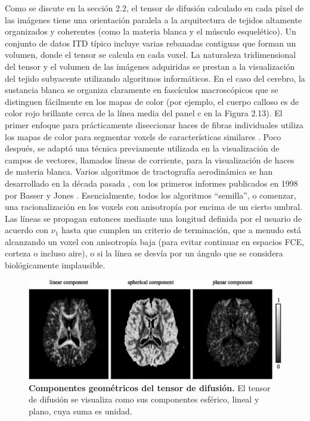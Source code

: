 \documentclass[12pt,a5,twoside]{book}
\begin{document}
Como se discute en la sección 2.2, el tensor de difusión calculado en cada píxel de las imágenes tiene una orientación paralela a la arquitectura de tejidos altamente organizados y coherentes (como la materia blanca y el músculo esquelético). Un conjunto de datos ITD típico incluye varias rebanadas contiguas que forman un volumen, donde el tensor se calcula en cada voxel. La naturaleza tridimensional del tensor y el volumen de las imágenes adquiridas se prestan a la visualización del tejido subyacente utilizando algoritmos informáticos. 
En el caso del cerebro, la sustancia blanca se organiza claramente en fascículos macroscópicos que se distinguen fácilmente en los mapas de color (por ejemplo, el cuerpo calloso es de color rojo brillante cerca de la línea media del panel c en la Figura 2.13). El primer enfoque para prácticamente diseccionar haces de fibras individuales utiliza los mapas de color para segmentar voxels de características similares \citep{Makris_1997}. Poco después, se adaptó una técnica previamente utilizada en la visualización de campos de vectores, llamados líneas de corriente, para la visualización de haces de materia blanca. Varios algoritmos de tractografía aerodinámica se han desarrollado en la década pasada \citep{Mori_1999,Lazar_2003}, con los primeros informes publicados en 1998 por Basser \citep{Basser_1998} y Jones \citep{Jones_1998}. Esencialmente, todos los algoritmos ``semilla'', o comenzar, una racionalización en los voxels con anisotropía por encima de un cierto umbral. Las líneas se propagan entonces mediante una longitud definida por el usuario de acuerdo con $\nu_1$ hasta que cumplen un criterio de terminación, que a menudo está alcanzando un voxel con anisotropía baja (para evitar continuar en espacios FCE, corteza o incluso aire), o si la línea se desvía por un ángulo que se considera biológicamente implausible.

\begin{figure}
	\centering
    \includegraphics [scale=0.9,center] {DTI_quantMaps_spher.eps}
    \caption{\textbf{Componentes geométricos del tensor de difusión.} El tensor de difusión se visualiza como sus componentes esférico, lineal y plano, cuya suma es unidad.}
    \label{F:DTI_quantMaps_spher}
\end{figure}
\end{document}
